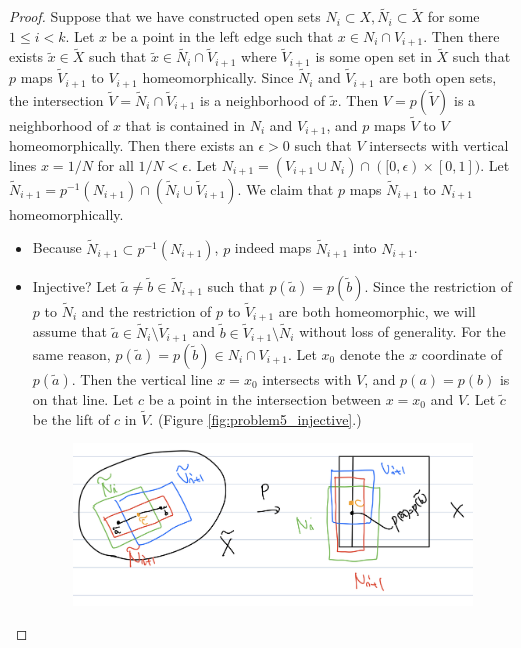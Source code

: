 \documentclass[12pt, psamsfonts]{amsart}
\theoremstyle{definition}
\theoremstyle{remark}
\numberwithin{equation}{section}
\begin{document}
\begin{proof}
  Suppose that we have constructed open sets $N_i \subset X, \tilde{N_i} \subset \tilde{X}$ for some $1 \leq i < k$.
  Let $x$ be a point in the left edge such that $x \in N_i \cap V_{i + 1}$.
  Then there exists $\tilde{x} \in \tilde{X}$ such that $\tilde{x} \in \tilde{N_i} \cap \tilde{V}_{i + 1}$ where $\tilde{V}_{i + 1}$ is some open set in $\tilde{X}$ such that $p$ maps $\tilde{V}_{i + 1}$ to $V_{i + 1}$ homeomorphically.
  Since $\tilde{N}_i$ and $\tilde{V}_{i + 1}$ are both open sets, the intersection $\tilde{V} = \tilde{N}_i \cap \tilde{V}_{i + 1}$ is a neighborhood of $\tilde{x}$.
  Then $V = p(\tilde{V})$ is a neighborhood of $x$ that is contained in $N_i$ and $V_{i + 1}$, and $p$ maps $\tilde{V}$ to $V$ homeomorphically.
  Then there exists an $\epsilon > 0$ such that $V$ intersects with vertical lines $x = 1 / N$ for all $1 / N < \epsilon$.
  Let $N_{i + 1} = (V_{i + 1} \cup N_i) \cap ([0, \epsilon) \times [0, 1])$.
  Let $\tilde{N}_{i + 1} = p^{-1}(N_{i + 1}) \cap (\tilde{N}_i \cup \tilde{V}_{i + 1})$.
  We claim that $p$ maps $\tilde{N}_{i + 1}$ to $N_{i + 1}$ homeomorphically.
  \begin{itemize}
    \item
      Because $\tilde{N}_{i + 1} \subset p^{-1}(N_{i + 1})$, $p$ indeed maps $\tilde{N}_{i + 1}$ into $N_{i + 1}$.
    \item
      Injective?
      Let $\tilde{a} \ne \tilde{b} \in \tilde{N}_{i + 1}$ such that $p(\tilde{a}) = p(\tilde{b})$.
      Since the restriction of $p$ to $\tilde{N}_i$ and the restriction of $p$ to $\tilde{V}_{i + 1}$ are both homeomorphic,
      we will assume that $\tilde{a} \in \tilde{N}_i \setminus \tilde{V}_{i + 1}$ and $\tilde{b} \in \tilde{V}_{i + 1} \setminus \tilde{N}_i$ without loss of generality.
      For the same reason, $p(\tilde{a}) = p(\tilde{b}) \in N_i \cap V_{i + 1}$.
      Let $x_0$ denote the $x$ coordinate of $p(\tilde{a})$.
      Then the vertical line $x = x_0$ intersects with $V$, and $p(a) = p(b)$ is on that line.
      Let $c$ be a point in the intersection between $x = x_0$ and $V$.
      Let $\tilde{c}$ be the lift of $c$ in $\tilde{V}$.
      (Figure \ref{fig:problem5_injective}.)
      \begin{figure}
        \includegraphics[width=.5\linewidth]{problem5_injective.jpeg}

\end{figure}
\end{itemize}
\end{proof}
\end{document}
